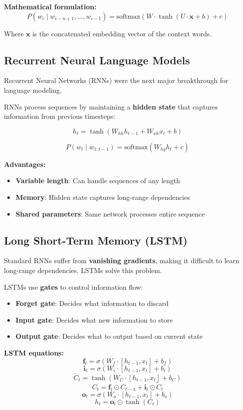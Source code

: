 \documentclass[11pt,a4paper]{article}
\theoremstyle{definition}
\theoremstyle{plain}
\theoremstyle{remark}
\begin{document}
\textbf{Mathematical formulation:}
\[
P(w_i \mid w_{i-n+1}, \ldots, w_{i-1}) = \text{softmax}(W \cdot \tanh(U \cdot \mathbf{x} + b) + c)
\]

Where $\mathbf{x}$ is the concatenated embedding vector of the context words.

\subsection{Recurrent Neural Language Models}

Recurrent Neural Networks (RNNs) were the next major breakthrough for language modeling.

\begin{tcolorbox}[colback=green!5!white,colframe=green!75!black,title=\textbf{RNN Language Models}]
RNNs process sequences by maintaining a \textbf{hidden state} that captures information from previous timesteps:

\[
h_t = \tanh(W_{hh} h_{t-1} + W_{xh} x_t + b)
\]

\[
P(w_t \mid w_{1:t-1}) = \text{softmax}(W_{hy} h_t + c)
\]
\end{tcolorbox}

\textbf{Advantages:}
\begin{itemize}
    \item \textbf{Variable length}: Can handle sequences of any length
    \item \textbf{Memory}: Hidden state captures long-range dependencies
    \item \textbf{Shared parameters}: Same network processes entire sequence
\end{itemize}

\subsection{Long Short-Term Memory (LSTM)}

Standard RNNs suffer from \textbf{vanishing gradients}, making it difficult to learn long-range dependencies. LSTMs solve this problem.

\begin{tcolorbox}[colback=orange!5!white,colframe=orange!75!black,title=\textbf{LSTM Architecture}]
LSTMs use \textbf{gates} to control information flow:

\begin{itemize}
    \item \textbf{Forget gate}: Decides what information to discard
    \item \textbf{Input gate}: Decides what new information to store
    \item \textbf{Output gate}: Decides what to output based on current state
\end{itemize}

\textbf{LSTM equations:}
\[
\mathbf{f}_t = \sigma(W_f \cdot [h_{t-1}, x_t] + b_f)
\]
\[
\mathbf{i}_t = \sigma(W_i \cdot [h_{t-1}, x_t] + b_i)
\]
\[
\tilde{C}_t = \tanh(W_C \cdot [h_{t-1}, x_t] + b_C)
\]
\[
C_t = \mathbf{f}_t \odot C_{t-1} + \mathbf{i}_t \odot \tilde{C}_t
\]
\[
\mathbf{o}_t = \sigma(W_o \cdot [h_{t-1}, x_t] + b_o)
\]
\[
h_t = \mathbf{o}_t \odot \tanh(C_t)
\]
\end{tcolorbox}
\end{document}
